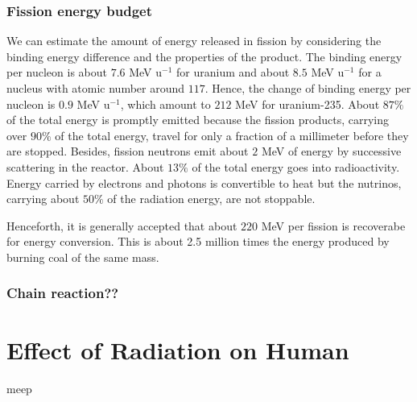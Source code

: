 \documentclass[preprint,aip,cha]{revtex4-1}
\begin{document}
        \subsubsection{Fission energy budget}
        We can estimate the amount of energy released in fission by considering the binding energy difference
        and the properties of the product.
        The binding energy per nucleon is about $7.6$ MeV u${}^{-1}$ for uranium and about $8.5$ MeV u${}^{-1}$
        for a nucleus with atomic number around $117$. Hence, the change of binding energy per nucleon is
        $0.9$ MeV u${}^{-1}$, which amount to $212$ MeV for uranium-235.
        About $87\%$ of the total energy is promptly emitted because
        the fission products, carrying over $90\%$ of the total energy, travel for only a fraction of a
        millimeter before they are stopped. Besides, fission neutrons emit about $2$ MeV of energy by
        successive scattering in the reactor.
        About $13\%$ of the total energy goes into radioactivity. Energy carried by electrons and photons is
        convertible to heat but the nutrinos, carrying about $50\%$ of the radiation energy, are not stoppable.

        Henceforth, it is generally accepted that about $220$ MeV per fission is recoverabe for energy conversion.
        This is about 2.5 million times the energy produced by burning coal of the same mass.\cite{e17}
        \subsubsection{Chain reaction??}

\section{Effect of Radiation on Human}
    meep
\end{document}
